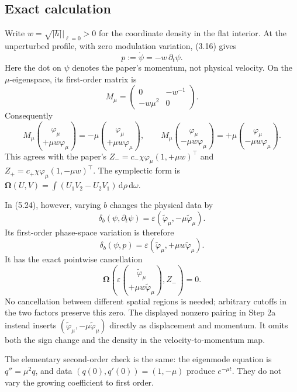 \documentclass[10pt]{article}
\begin{document}
\subsection*{Exact calculation}
Write \(w=\sqrt{|h|}|_{\ell=0}>0\) for the coordinate density in the flat interior. At the unperturbed profile, with zero modulation variation, (3.16) gives \[p:=\dot\psi=-w\,\partial_t\psi.\] Here the dot on \(\psi\) denotes the paper’s momentum, not physical velocity. On the \(\mu\)-eigenspace, its first-order matrix is \[M_\mu=\begin{pmatrix}0&-w^{-1}\\-w\mu^2&0\end{pmatrix}.\] Consequently \[M_\mu\binom{\varphi_\mu}{+\mu w\varphi_\mu}
=-\mu\binom{\varphi_\mu}{+\mu w\varphi_\mu},\qquad
M_\mu\binom{\varphi_\mu}{-\mu w\varphi_\mu}
=+\mu\binom{\varphi_\mu}{-\mu w\varphi_\mu}.\] This agrees with the paper’s \(Z_-=c_-\chi\varphi_\mu(1,+\mu w)^\intercal\) and \(Z_+=c_+\chi\varphi_\mu(1,-\mu w)^\intercal\). The symplectic form is \(\boldsymbol\Omega(U,V)=\int(U_1V_2-U_2V_1)\,\mathrm d\rho\,\mathrm d\omega\).\par
In (5.24), however, varying \(b\) changes the physical data by \[\delta_b(\psi,\partial_t\psi)
=\varepsilon(\widetilde\varphi_\mu,-\mu\widetilde\varphi_\mu).\] Its first-order phase-space variation is therefore \[\delta_b(\psi,p)
=\varepsilon(\widetilde\varphi_\mu,+\mu w\widetilde\varphi_\mu).\] It has the exact pointwise cancellation \[\boldsymbol\Omega\!\left(\varepsilon
  \binom{\widetilde\varphi_\mu}{+\mu w\widetilde\varphi_\mu},Z_-\right)=0.
\tag{F01.1}\] No cancellation between different spatial regions is needed; arbitrary cutoffs in the two factors preserve this zero. The displayed nonzero pairing in Step 2a instead inserts \((\widetilde\varphi_\mu,-\mu\widetilde\varphi_\mu)\) directly as displacement and momentum. It omits both the sign change and the density in the velocity-to-momentum map.\par
The elementary second-order check is the same: the eigenmode equation is \(q''=\mu^2q\), and data \((q(0),q'(0))=(1,-\mu)\) produce \(e^{-\mu t}\). They do not vary the growing coefficient to first order.\par
\end{document}
